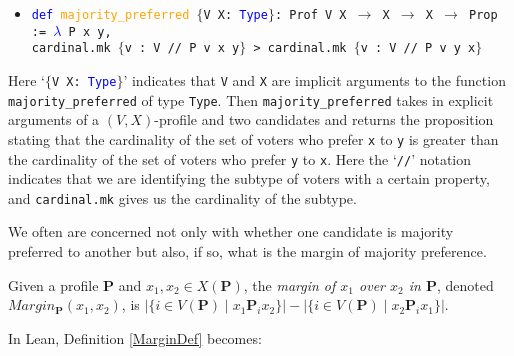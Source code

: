 \documentclass[runningheads]{llncs}
\begin{document}
\begin{itemize}
\item[] \texttt{\textcolor{blue}{def} \textcolor{orange}{majority\_preferred}  $\{$V X: \textcolor{blue}{Type}$\}$: Prof V X $\to$ X $\to$ X $\to$ Prop}\\ \texttt{:= \textcolor{blue}{$\lambda$} P x y,}\\
\texttt{cardinal.mk $\{$v : V // P v x y$\}$ >
cardinal.mk $\{$v : V // P v y x$\}$}
\end{itemize}
Here `\texttt{$\{$V X: \textcolor{blue}{Type}$\}$}' indicates that \texttt{V} and \texttt{X} are implicit arguments to the function \texttt{majority\_preferred} of type \texttt{Type}. Then \texttt{majority\_preferred} takes in explicit arguments of a $(V,X)$-profile and two candidates  and returns the proposition stating that the cardinality of the set of voters who prefer \texttt{x} to \texttt{y} is greater than the cardinality of the set of voters who prefer \texttt{y} to \texttt{x}. Here the `\texttt{//}' notation indicates that we are identifying the subtype of voters with a certain property, and \texttt{cardinal.mk} gives us the cardinality of the subtype.


We often are concerned not only with whether one candidate is majority preferred to another but also, if so, what is the margin of majority preference.

\begin{definition}\label{MarginDef} \textnormal{Given a profile $\mathbf{P}$ and $x_1,x_2\in X(\mathbf{P})$, the \textit{margin of $x_1$ over $x_2$ in $\mathbf{P}$}, denoted $Margin_\mathbf{P}(x_1,x_2)$, is $|\{i\in V(\mathbf{P})\mid x_1\mathbf{P}_ix_2\}|-|\{i\in V(\mathbf{P})\mid x_2\mathbf{P}_ix_1\}|$.}
\end{definition}
\noindent In Lean, Definition \ref{MarginDef} becomes:
\end{document}
